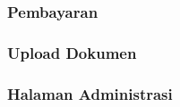 \subsubsection{Pembayaran}
\subsubsection{Upload Dokumen}
\subsubsection{Halaman Administrasi}






